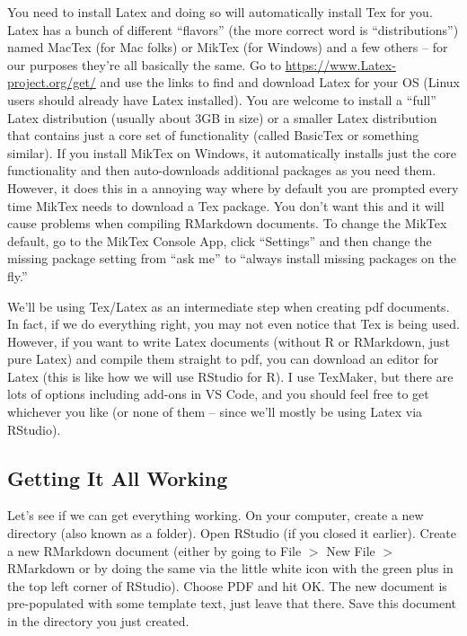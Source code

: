 \documentclass{article}\usepackage[]{graphicx}\usepackage[]{color}
\begin{document}
You need to install Latex and doing so will automatically install Tex for you. Latex has a bunch of different ``flavors'' (the more correct word is ``distributions'') named MacTex (for Mac folks) or MikTex (for Windows) and a few others -- for our purposes they're all basically the same. Go to \url{https://www.Latex-project.org/get/} and use the links to find and download Latex for your OS (Linux users should already have Latex installed). You are welcome to install a ``full'' Latex distribution (usually  about 3GB in size) or a smaller Latex distribution that contains just a core set of functionality (called BasicTex or something similar). If you install MikTex on Windows, it automatically installs just the core functionality and then auto-downloads additional packages as you need them. However, it does this in a annoying way where by default you are prompted every time MikTex needs to download a Tex package. You don't want this and it will cause problems when compiling RMarkdown documents. To change the MikTex default, go to the MikTex Console App, click ``Settings'' and then change the missing package setting from ``ask me'' to ``always install missing packages on the fly.''

We'll be using Tex/Latex as an intermediate step when creating pdf documents. In fact, if we do everything right, you may not even notice that Tex is being used. However, if you want to write Latex documents (without R or RMarkdown, just pure Latex) and compile them straight to pdf, you can download an editor for Latex (this is like how we will use RStudio for R). I use TexMaker, but there are lots of options including add-ons in VS Code, and you should feel free to get whichever you like (or none of them -- since we'll mostly be using Latex via RStudio).

\subsection*{Getting It All Working} %

Let's see if we can get everything working. On your computer, create a new directory (also known as a folder). Open RStudio (if you closed it earlier). Create a new RMarkdown document (either by going to File $>$ New File $>$ RMarkdown or by doing the same via the little white icon with the green plus in the top left corner of RStudio). Choose PDF and hit OK. The new document is pre-populated with some template text, just leave that there. Save this document in the directory you just created.
\end{document}
